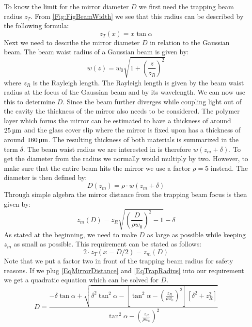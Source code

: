 To know the limit for the mirror diameter $D$ we first need the trapping beam radius $z_{\si{T}}$. From \autoref{Fig:FigBeamWidth} we see that this radius can be described by the following formula:
\begin{equation}\label{EqTrapRadius}
	z_{\si{T}}(x)=x\tan\alpha
\end{equation}
Next we need to describe the mirror diameter $D$ in relation to the Gaussian beam. The beam waist radius of a Gaussian beam is given by:
\begin{equation}
	w(z)=w_0\sqrt{1+\left(\frac{z}{z_{{\si{R}}}}\right)^2}
\end{equation}
where $z_{\si{R}}$ is the Rayleigh length. The Rayleigh length is given by the beam waist radius at the focus of the Gaussian beam and by its wavelength. We can now use this to determine $D$. Since the beam further diverges while coupling light out of the cavity the thickness of the mirror also needs to be considered.  The polymer layer which forms the mirror can be estimated to have a thickness of around $25\um$ and the glass cover slip where the mirror is fixed upon has a thickness of around $160\um$. The resulting thickness of both materials is summarized in the term $\delta$. The beam waist radius we are interested in is therefore $w(z_{\si{m}}+\delta)$. To get the diameter from the radius we normally would multiply by two. However, to make sure that the entire beam hits the mirror we use a factor $\rho = 5$ instead. The diameter is then defined by:
\begin{equation}\label{BeamDiameter}
	D(z_{\si{m}})=\rho\cdot w(z_{\si{m}}+\delta)
\end{equation}
Through simple algebra the mirror distance from the trapping beam focus is then given by:
\begin{equation}\label{EqMirrorDistance}
	z_{\si{m}}(D)=z_{\si{R}}\sqrt{\left(\frac{D}{\rho w_0}\right)^2-1}-\delta
\end{equation}
As stated at the beginning, we need to make $D$ as large as possible while keeping $z_{\si{m}}$ as small as possible. This requirement can be stated as follows:
\begin{equation}
	2\cdot z_{\si{T}}(x=D/2)=z_{\si{m}}(D)
\end{equation}
Note that we put a factor two in front of the trapping beam radius for safety reasons. If we plug \autoref{EqMirrorDistance} and \autoref{EqTrapRadius} into our requirement we get a quadratic equation which can be solved for $D$.
\begin{equation}
	D=\frac{-\delta\tan\alpha+\sqrt{\delta^2\tan^2\alpha -\left[\tan^2\alpha-\left(\frac{z_{\si{R}}}{\rho w_0}\right)^2\right]\left[\delta^2+z_{\si{R}}^2\right]}}{\tan^2\alpha-\left(\frac{z_{\si{R}}}{\rho w_0}\right)^2}
\end{equation}
